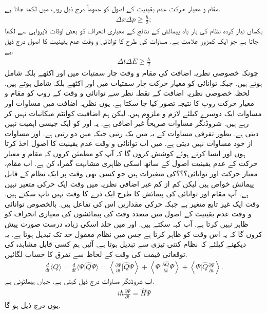 مقام و معیار حرکت عدم یقینیت کے اصول کو عموماً درج ذیل روپ میں لکھا جاتا ہے.
\begin{align}
\Delta x \Delta p \geq \frac{\hbar}{2} ;
\end{align}
یکساں تیار کردہ نظام کی بار باد پیمائش کے نتائج کے معیاری انحراف کو بعض اوقات لاپرواہی سے  لکھا جاتا ہے جو ایک کمزور علامت ہے. مساوات  کی طرح کا توانائی و وقت عدم یقینیت کا اصول درج ذیل ہے.
\begin{align}
\Delta t \Delta E \geq \frac{\hbar}{2}
\end{align}
چونکہ خصوصی نظریہ اضافت کی مقام و وقت چار سمتیات میں  اور  اکٹھے بلکہ  شامل ہوتے ہیں. جبکہ توانائی کو معیار حرکت چار سمتیات میں  اور  اکٹھے بلکہ  شامل ہوتے ہیں. لحظہ خصوصی نظریہ اضافت کے نقطہ نظر سے توانائی و وقت کے روپ کو مقام و معیار حرکت روپ کا نتیجہ تصور کیا جا سکتا ہے. یوں نظریہ اضافت میں مساوات  اور مساوات  ایک دوسرے کیلئے لازم و ملزوم ہیں. لیکن ہم اضافیت کوانٹم میکانیات نہیں کر رہے ہیں. شروڈنگر مساوات صریحاً غیر اضافی ہے. یہ  اور  کو ایک جیسی اہمیت نہیں دیتی ہے. بطور تفرقی مساوات کے یہ  میں یک رتبی جبکہ  میں دو رتبی ہے. اور مساوات  از خود مساوات  نہیں دیتی ہے. میں اب توانائی و وقت عدم یقینیت کا اصول اخذ کرتا ہوں اور ایسا کرتے ہوئے کوشش کروں گا کہ آپ کو مطمئن کروں کہ مقام و معیار حرکت کے عدم یقینیت اصول کے ساتھ اسکی ظاہری مشابہت گمراہ کن ہے.
اب مقام، معیار حرکت اور توانائی؟؟؟کی متغیرات ہیں جو کسی بھی وقت پر ایک نظام کے قابل پیمائش خواص ہیں لیکن کم از کم غیر اضافی نظریہ میں وقت ایک حرکی متغیر نہیں ہے. آپ مقام اور توانائی کی پیمائش کا طرح ایک ذرے کا وقت نہیں ناپ سکتے ہیں. وقت ایک غیر تابع متغیر ہے جبکہ حرکی مقداریں اس کی تفاعل ہیں. بالخصوص توانائی و وقت عدم یقینیت کے اصول میں متعدد وقت کی پیمائشوں کی معیاری انحراف کو  ظاہر نہیں کرتا ہے. آپ کہہ سکتے ہیں. اور میں جلد اسکی زیادہ درست صورت پیش کروں گا کہ یہ اس وقت کو ظاہر کرتا ہے جس میں نظام معقول حد تک تبدیل ہوتا ہے. یہ دیکھنے کیلئے کہ نظام کتنی تیزی سے تبدیل ہوتا ہے, آئیں ہم کسی قابل مشاہدہ  کی توقعاتی قیمت کی وقت کے لحاظ سے تفرق کا حساب لگائیں. 
\begin{align*}
\frac{d}{dt} \langle Q \rangle = \frac{d}{dt} \langle \Psi | \hat{Q} \Psi \rangle = \left\langle \frac{\partial\Psi}{\partial t} \vert \hat{Q} \Psi \right\rangle + \left\langle \Psi \vert \frac{\partial \hat{Q}}{\partial t} \Psi \right\rangle + \left\langle \Psi \vert \hat{Q} \frac{\partial \Psi}{\partial t} \right\rangle .
\end{align*}
اب شروڈنگر مساوات درج ذیل کہتی ہے. جہاں  ہیملٹونی ہے. 
\begin{align*}
i \hbar \frac{\partial \Psi}{\partial t} = \hat{H} \Psi
\end{align*}
یوں درج ذیل ہو گا. 

